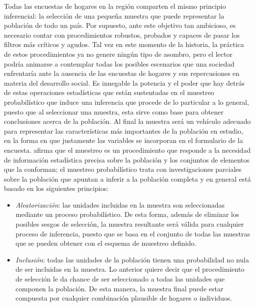Todas las encuestas de hogares en la región comparten el mismo principio inferencial: la selección de una pequeña muestra que puede representar la población de todo un país. Por supuesto, ante este objetivo tan ambicioso, es necesario contar con procedimientos robustos, probados y capaces de pasar los filtros más críticos y agudos. Tal vez en este momento de la historia, la práctica de estos procedimientos ya no genere ningún tipo de asombro, pero el lector podría animarse a contemplar todas los posibles escenarios que una sociedad enfrentaría ante la ausencia de las encuestas de hogares y sus repercusiones en materia del desarrollo social. Es innegable la potencia y el poder que hay detrás de estas operaciones estadísticas que están sustentadas en el muestreo probabilístico que induce una inferencia que procede de lo particular a lo general, puesto que al seleccionar una muestra, esta sirve como base para obtener conclusiones acerca de la población. Al final la muestra será un vehículo adecuado para representar las características más importantes de la población en estudio, en la forma en que justamente las variables se incorporan en el formulario de la encuesta. \citet{Gutierrez_2016} afirma que el muestreo es un procedimiento que responde a la necesidad de información estadística precisa sobre la población y los conjuntos de elementos que la conforman; el muestreo probabilístico trata con investigaciones parciales sobre la población que apuntan a inferir a la población completa y en general está basado en los siguientes principios:

\begin{itemize}
\tightlist
\item
  \emph{Aleatorización}: las unidades incluidas en la muestra son seleccionadas mediante un proceso probabilístico. De esta forma, además de eliminar los posibles sesgos de selección, la muestra resultante será válida para cualquier proceso de inferencia, puesto que se basa en el conjunto de todas las muestras que se pueden obtener con el esquema de muestreo definido.
\item
  \emph{Inclusión}: todas las unidades de la población tienen una probabilidad no nula de ser incluidas en la muestra. Lo anterior quiere decir que el procedimiento de selección le da chance de ser seleccionado a todas las unidades que componen la población. De esta manera, la muestra final puede estar compuesta por cualquier combinación plausible de hogares o individuos.
\end{itemize}

